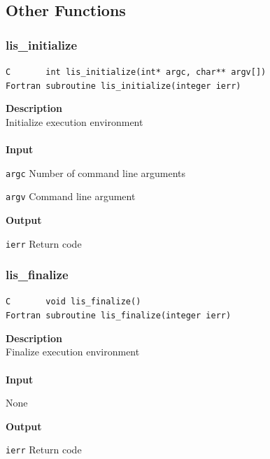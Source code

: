 \documentclass[a4paper]{article}
\newcommand{\namelistlabel}[1]{\mbox{#1}\hfill}
\newenvironment{namelist}[1]{%
 \begin{list}{}
  {\let\makelabel\namelistlabel
  \settowidth{\labelwidth}{#1}
  \setlength{\leftmargin}{1.1\labelwidth}}
}{%
\end{list}}
\begin{document}
\newpage
\subsection{Other Functions}
  \subsubsection{lis\_initialize}
\begin{screen}
\verb|C       int lis_initialize(int* argc, char** argv[])|\\
\verb|Fortran subroutine lis_initialize(integer ierr)|
\end{screen}
{\bf Description}\\
\indent
Initialize execution environment
\\ \\
\noindent
{\bf Input}
\begin{namelist}{XXXXXXXXXXXXXXXXXXXX}
\item[\tt argc] Number of command line arguments
\item[\tt argv] Command line argument
\end{namelist}
{\bf Output}
\begin{namelist}{XXXXXXXXXXXXXXXXXXXX}
\item[\tt ierr] Return code
\end{namelist}
  \subsubsection{lis\_finalize}
\begin{screen}
\verb|C       void lis_finalize()|\\
\verb|Fortran subroutine lis_finalize(integer ierr)|
\end{screen}
{\bf Description}\\
\indent
Finalize execution environment
\\ \\
\noindent
{\bf Input}
\begin{namelist}{XXXXXXXXXXXXXXXXXXXX}
\item[None] 
\end{namelist}
{\bf Output}
\begin{namelist}{XXXXXXXXXXXXXXXXXXXX}
\item[\tt ierr] Return code
\end{namelist}
\end{document}
